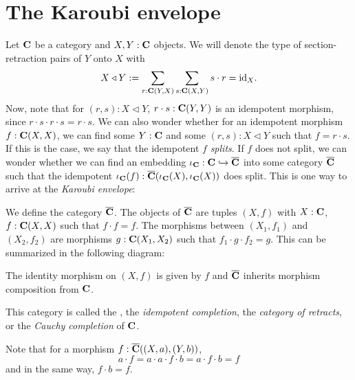 \section{The Karoubi envelope}
Let $ \mathbf{C} $ be a category and $ X, Y : \mathbf{C} $ objects. We will denote the type of section-retraction pairs of $ Y $ onto $ X $ with
\[ X \triangleleft Y := \sum_{r : \mathbf{C}(Y, X)} \sum_{s : \mathbf{C}(X, Y)} s \cdot r = \text{id}_{X}. \]
Now, note that for $ (r, s) : X \triangleleft Y $, $ r \cdot s: \mathbf{C}(Y, Y) $ is an idempotent morphism, since $ r \cdot s \cdot r \cdot s = r \cdot s $. We can also wonder whether for an idempotent morphism $ f: \mathbf{C}(X, X) $, we can find some $ Y : \mathbf{C} $ and some $ (r, s) : X \triangleleft Y $ such that $ f = r \cdot s $. If this is the case, we say that the idempotent $ f $ \textit{splits}. If $ f $ does not split, we can wonder whether we can find an embedding $ \iota_{\mathbf{C}} : \mathbf{C} \hookrightarrow \overline {\mathbf{C}} $ into some category $ \overline {\mathbf{C}} $ such that the idempotent $ \iota_{\mathbf{C}}(f): \overline {\mathbf{C}}(\iota_{\mathbf{C}}(X), \iota_{\mathbf{C}}(X)) $ does split. This is one way to arrive at the \textit{Karoubi envelope}:

\begin{definition}
  We define the category $ \overline {\mathbf{C}} $. The objects of $ \overline {\mathbf{C}} $ are tuples $ (X, f) $ with $ X: \mathbf{C} $, $ f: \mathbf{C}(X, X) $ such that $ f \cdot f = f $. The morphisms between $ (X_1, f_1) $ and $ (X_2, f_2) $ are morphisms $ g: \mathbf{C}(X_1, X_2) $ such that $ f_1 \cdot g \cdot f_2 = g $. This can be summarized in the following diagram:
  \begin{center}
  \end{center}
  The identity morphism on $ (X, f) $ is given by $ f $ and $ \overline {\mathbf{C}} $ inherits morphism composition from $ \mathbf{C} $.
\end{definition}
This category is called the , the \textit{idempotent completion}, the \textit{category of retracts}, or the \textit{Cauchy completion} of $ \mathbf{C} $.

\begin{remark}
  Note that for a morphism $ f: \overline {\mathbf{C}}((X, a), (Y, b)) $,
  \[ a \cdot f = a \cdot a \cdot f \cdot b = a \cdot f \cdot b = f \]
  and in the same way, $ f \cdot b = f $.
\end{remark}

